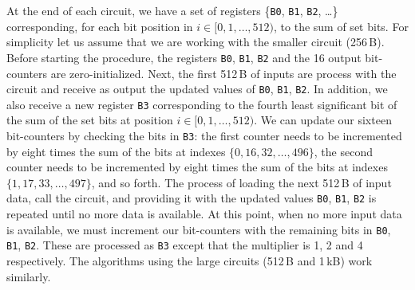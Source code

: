 \documentclass[AMA,STIX1COL]{WileyNJD-v2}
\begin{document}
At the end of each circuit, we have a set of registers \{\texttt{B0}, \texttt{B1}, \texttt{B2}, \ldots\} corresponding, for each bit position in $i\in [0,1,\ldots, 512)$, to the sum of set bits. 
For simplicity let us assume that we are working with the smaller circuit (256\,B). Before starting the procedure, the registers \texttt{B0}, \texttt{B1}, \texttt{B2} and the 16 output bit-counters are zero-initialized. Next, the first 512\,B of inputs are process with the circuit and receive as output the updated values of \texttt{B0}, \texttt{B1}, \texttt{B2}. In addition, we also receive a new register \texttt{B3} corresponding to the fourth least significant bit of the sum of the set bits at position $i\in [0,1,\ldots, 512)$. We can update our sixteen bit-counters by checking the bits in \texttt{B3}: the first counter needs to be incremented by eight times the sum of the bits at indexes $\{0, 16, 32, \ldots, 496\}$, the second counter needs to be 
incremented by eight times the sum of the bits at indexes $\{1, 17, 33, \ldots, 497\}$, and so forth. The process of loading the next 512\,B of input data, call the circuit, and providing it with the updated values \texttt{B0}, \texttt{B1}, \texttt{B2} is repeated until no more data is available. At this point, when no more input data is available, we must increment our bit-counters with the remaining bits in \texttt{B0}, \texttt{B1}, \texttt{B2}. These are processed as \texttt{B3} except that the multiplier is 1, 2 and 4 respectively. The algorithms using the large circuits (512\,B and 1\,kB) work similarly.
\end{document}
